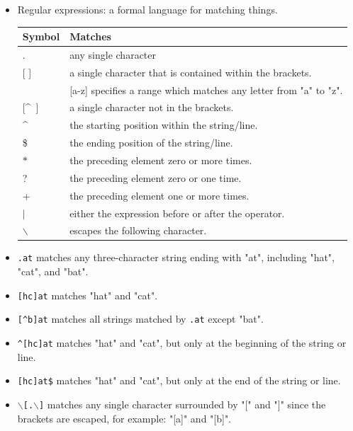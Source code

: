 \documentclass[a4paper,landscape,headrule,footrule,dvips]{foils}
\begin{document}
\begin{CJK}{UTF8}{min}
\begin{itemize}
\item Regular expressions: a formal language for matching things.
\\[2ex]
  \begin{tabular}{ll}
    Symbol & Matches \\ \hline
    . & any single character\\
    {[ ]} & a single character that is contained within the brackets. \\
    & {[a-z]} specifies a range which matches any  letter from "a" to "z".\\
    {[\textasciicircum ~]} & 	a single character not in the brackets. \\
    \textasciicircum 	& the starting position within the string/line. \\
    \$ 	&  the ending position of the string/line. \\
    $*$ &	the preceding element zero or more times. \\
    ? &	 the preceding element zero or one time. \\
    + &	 the preceding element one or more times. \\
    $|$ &  either the expression before or after the operator. \\
    $\backslash$ & escapes the following character. \\
  \end{tabular}

\end{itemize}

\begin{itemize}
\item  \texttt{.at} matches any three-character string ending with "at", including "hat", "cat", and "bat".
\item \texttt{[hc]at} matches "hat" and "cat".
\item \texttt{[\textasciicircum{}b]at} matches all strings matched by \texttt{.at} except "bat".
\item \texttt{\textasciicircum{}[hc]at} matches "hat" and "cat", but only at the beginning of the string or line.
\item \texttt{[hc]at\$} matches "hat" and "cat", but only at the end of the string or line.
\item \texttt{$\backslash$[.$\backslash$]} matches any single character surrounded by "[" and "]" since the brackets are escaped, for example: "[a]" and "[b]".
\end{itemize}




\end{CJK}
\end{document}
